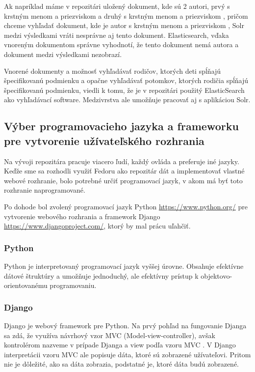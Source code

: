 \documentclass[thesis=M,slovak]{FITthesis}[2013/05/06]
\begin{document}
Ak napríklad máme v repozitári uložený dokument, kde sú 2 autori, prvý s krstným menom  a priezviskom  a druhý s krstným menom  a priezviskom , pričom chceme vyhľadať dokument, kde je autor s krstným menom  a priezviskom , Solr medzi výsledkami vráti nesprávne aj tento dokument. Elasticsearch, vďaka vnoreným dokumentom správne vyhodnotí, že tento dokument nemá autora  a dokument medzi výsledkami nezobrazí.

Vnorené dokumenty a možnosť vyhľadávať rodičov, ktorých deti spĺňajú špecifikovanú podmienku a opačne vyhľadávať potomkov, ktorých rodičia spĺňajú špecifikovanú podmienku, viedli k tomu, že je v repozitári použitý ElasticSearch ako vyhľadávací software. Medzivrstva ale umožňuje pracovať aj s aplikáciou Solr.

\subsection{Výber programovacieho jazyka a frameworku pre vytvorenie užívateľského rozhrania}
Na vývoji repozitára pracuje viacero ľudí, každý ovláda a preferuje iné jazyky. Keďže sme sa rozhodli využiť Fedoru ako repozitár dát a implementovať vlastné webové rozhranie, bolo potrebné určiť programovací jazyk, v akom má byť toto rozhranie naprogramované.

Po dohode bol zvolený programovací jazyk Python \url{https://www.python.org/} pre vytvorenie webového rozhrania a framework Django \url{https://www.djangoproject.com/}, ktorý by mal prácu uľahčiť.

\subsubsection{Python}
Python je interpretovaný programovací jazyk vyššej úrovne. Obsahuje efektívne dátové štruktúry a umožňuje jednoduchý, ale efektívny prístup k objektovo-orientovanému programovaniu. \cite{Python}

\subsubsection{Django}
Django je webový framework pre Python. Na prvý pohľad na fungovanie Djanga sa zdá, že využíva návrhový vzor MVC (Model-view-controller), \mbox{avšak} kontrolérom nazveme v prípade Djanga  a view podľa vzoru MVC . V Django interpretácii vzoru MVC ale  popisuje dáta, ktoré sú zobrazené užívateľovi. Pritom nie je dôležité, ako sa dáta zobrazia, podstatné je, ktoré dáta budú zobrazené.
\end{document}
